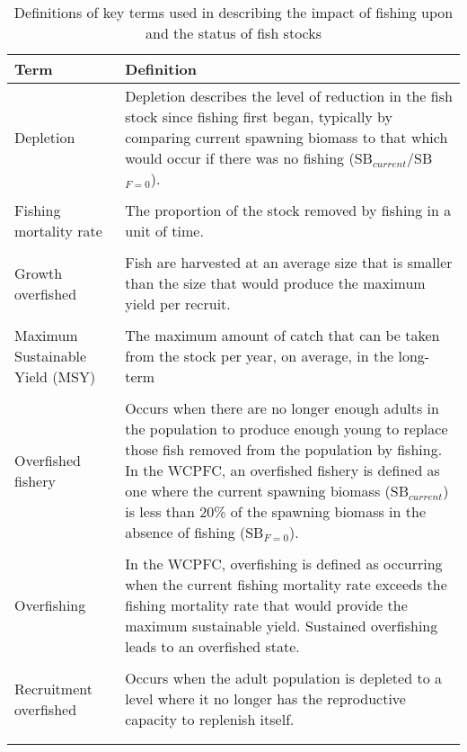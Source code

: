 \begingroup\fontsize{9pt}{11pt}\selectfont
\begin{longtable}{p{5cm}p{10cm}}
\caption{Definitions of key terms used in describing the impact of fishing upon and the status of fish stocks} \\ 
  \hline
\hline
Term & Definition \\ 
  \hline
Depletion & Depletion describes the level of reduction in the fish stock since fishing first began, typically by comparing current spawning biomass to that which would occur if there was no fishing (SB$_{current}$/SB$_{F=0}$). \\ \\
   Fishing mortality rate & The proportion of the stock removed by fishing in a unit of time. \\ \\
  Growth overfished & Fish are harvested at an average size that is smaller than the size that would produce the maximum yield per recruit. \\ \\
   Maximum Sustainable Yield (MSY) & The maximum amount of catch that can be taken from the stock per year, on average, in the long-term \\ \\
  Overfished fishery  & Occurs when there are no longer enough adults in the population to produce enough young to replace those fish removed from the population by fishing.  In the WCPFC, an overfished fishery is defined as one where the current spawning biomass (SB$_{current}$) is less than 20\% of the spawning biomass in the absence of fishing (SB$_{F=0}$).  \\ \\
   Overfishing  & In the WCPFC, overfishing is defined as occurring when the current fishing mortality rate exceeds the fishing mortality rate that would provide the maximum sustainable yield. Sustained overfishing leads to an overfished state. \\ \\
  Recruitment overfished & Occurs when the adult population is depleted to a level where it no longer has the reproductive capacity to replenish itself. \\ \\
   \hline
\hline
\label{tab1}
\end{longtable}
\endgroup
